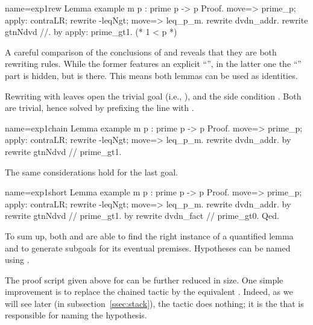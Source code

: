 \begin{coq}{name=exp1rew}{}
Lemma example m p : prime p -> p %
Proof.
move=> prime_p; apply: contraLR; rewrite -leqNgt; move=> leq_p_m.
rewrite dvdn_addr.
  rewrite gtnNdvd //.
  by apply: prime_gt1.  (* 1 < p *)
\end{coq}
A careful comparison of the conclusions of 
and  reveals that they are both rewriting rules.  While
the former features an explicit ``'', in the
latter one the ``'' part is hidden, but is there.
This means
both lemmas can be used as identities.


Rewriting with
 leaves open the trivial goal  (i.e., ),
and the side condition .  Both are trivial, hence
solved by prefixing the line with .

\begin{coq}{name=exp1chain}{}
Lemma example m p : prime p -> p %
Proof.
move=> prime_p; apply: contraLR; rewrite -leqNgt; move=> leq_p_m.
rewrite dvdn_addr.
  by rewrite gtnNdvd // prime_gt1.
\end{coq}
The same considerations hold for the last goal.

\begin{coq}{name=exp1short}{}
Lemma example m p : prime p -> p %
Proof.
move=> prime_p; apply: contraLR; rewrite -leqNgt; move=> leq_p_m.
rewrite dvdn_addr.
  by rewrite gtnNdvd // prime_gt1.
by rewrite dvdn_fact // prime_gt0.
Qed.
\end{coq}


To sum up, both  and  are able to find the right
instance of a quantified lemma and to generate subgoals
for its eventual premises.  Hypotheses can be named using .

The proof script given above for  can be further
reduced in size. One simple improvement is to replace the chained
tactic  by the equivalent
. Indeed, as we will see later (in
subsection~\ref{ssec:stack}), the  tactic does nothing; it
is the \C{=>} that is responsible for naming the hypothesis.

